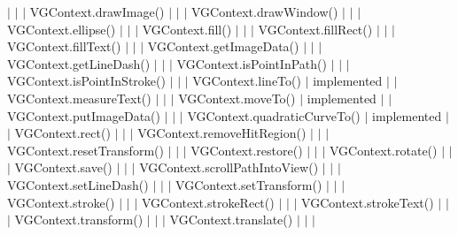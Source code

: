 $\vert$ $\vert$ $\vert$ {\ttfamily V\+G\+Context.\+draw\+Image()} $\vert$ $\vert$ $\vert$ {\ttfamily V\+G\+Context.\+draw\+Window()} $\vert$ $\vert$ $\vert$ {\ttfamily V\+G\+Context.\+ellipse()} $\vert$ $\vert$ $\vert$ {\ttfamily V\+G\+Context.\+fill()} $\vert$ $\vert$ $\vert$ {\ttfamily V\+G\+Context.\+fill\+Rect()} $\vert$ $\vert$ $\vert$ {\ttfamily V\+G\+Context.\+fill\+Text()} $\vert$ $\vert$ $\vert$ {\ttfamily V\+G\+Context.\+get\+Image\+Data()} $\vert$ $\vert$ $\vert$ {\ttfamily V\+G\+Context.\+get\+Line\+Dash()} $\vert$ $\vert$ $\vert$ {\ttfamily V\+G\+Context.\+is\+Point\+In\+Path()} $\vert$ $\vert$ $\vert$ {\ttfamily V\+G\+Context.\+is\+Point\+In\+Stroke()} $\vert$ $\vert$ $\vert$ {\ttfamily V\+G\+Context.\+line\+To()} $\vert$ implemented $\vert$ $\vert$ {\ttfamily V\+G\+Context.\+measure\+Text()} $\vert$ $\vert$ $\vert$ {\ttfamily V\+G\+Context.\+move\+To()} $\vert$ implemented $\vert$ $\vert$ {\ttfamily V\+G\+Context.\+put\+Image\+Data()} $\vert$ $\vert$ $\vert$ {\ttfamily V\+G\+Context.\+quadratic\+Curve\+To()} $\vert$ implemented $\vert$ $\vert$ {\ttfamily V\+G\+Context.\+rect()} $\vert$ $\vert$ $\vert$ {\ttfamily V\+G\+Context.\+remove\+Hit\+Region()} $\vert$ $\vert$ $\vert$ {\ttfamily V\+G\+Context.\+reset\+Transform()} $\vert$ $\vert$ $\vert$ {\ttfamily V\+G\+Context.\+restore()} $\vert$ $\vert$ $\vert$ {\ttfamily V\+G\+Context.\+rotate()} $\vert$ $\vert$ $\vert$ {\ttfamily V\+G\+Context.\+save()} $\vert$ $\vert$ $\vert$ {\ttfamily V\+G\+Context.\+scroll\+Path\+Into\+View()} $\vert$ $\vert$ $\vert$ {\ttfamily V\+G\+Context.\+set\+Line\+Dash()} $\vert$ $\vert$ $\vert$ {\ttfamily V\+G\+Context.\+set\+Transform()} $\vert$ $\vert$ $\vert$ {\ttfamily V\+G\+Context.\+stroke()} $\vert$ $\vert$ $\vert$ {\ttfamily V\+G\+Context.\+stroke\+Rect()} $\vert$ $\vert$ $\vert$ {\ttfamily V\+G\+Context.\+stroke\+Text()} $\vert$ $\vert$ $\vert$ {\ttfamily V\+G\+Context.\+transform()} $\vert$ $\vert$ $\vert$ {\ttfamily V\+G\+Context.\+translate()} $\vert$ $\vert$ $\vert$ 